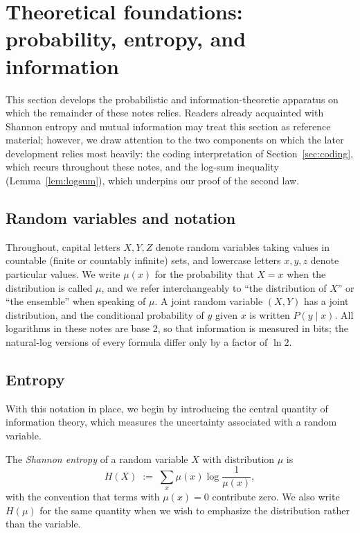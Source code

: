\documentclass[11pt]{article}
\begin{document}
\section{Theoretical foundations: probability, entropy, and information}
\label{sec:prelim}

This section develops the probabilistic and information-theoretic apparatus on which the remainder of these notes relies. Readers already acquainted with Shannon entropy and mutual information may treat this section as reference material; however, we draw attention to the two components on which the later development relies most heavily: the coding interpretation of Section~\ref{sec:coding}, which recurs throughout these notes, and the log-sum inequality (Lemma~\ref{lem:logsum}), which underpins our proof of the second law.

\subsection{Random variables and notation}

Throughout, capital letters $X, Y, Z$ denote random variables taking values in countable (finite or countably infinite) sets, and lowercase letters $x, y, z$ denote particular values. We write $\mu(x)$ for the probability that $X = x$ when the distribution is called $\mu$, and we refer interchangeably to ``the distribution of $X$'' or ``the ensemble'' when speaking of $\mu$. A joint random variable $(X, Y)$ has a joint distribution, and the conditional probability of $y$ given $x$ is written $P(y \mid x)$. All logarithms in these notes are base 2, so that information is measured in bits; the natural-log versions of every formula differ only by a factor of $\ln 2$.

\subsection{Entropy}

With this notation in place, we begin by introducing the central quantity of information theory, which measures the uncertainty associated with a random variable.

\begin{definition}
\label{def:entropy}
The \emph{Shannon entropy} of a random variable $X$ with distribution $\mu$ is
\[
H(X) \;:=\; \sum_{x} \mu(x) \log \frac{1}{\mu(x)},
\]
with the convention that terms with $\mu(x) = 0$ contribute zero. We also write $H(\mu)$ for the same quantity when we wish to emphasize the distribution rather than the variable.
\end{definition}
\end{document}
